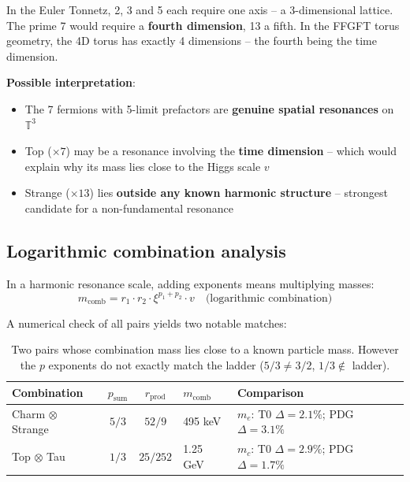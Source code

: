 In the Euler Tonnetz, 2, 3 and 5 each require one axis -- a
3-dimensional lattice. The prime 7 would require a
\textbf{fourth dimension}, 13 a fifth. In the FFGFT torus geometry,
the 4D torus has exactly 4 dimensions -- the fourth being the time
dimension.

\textbf{Possible interpretation}:
\begin{itemize}
    \item The 7 fermions with 5-limit prefactors are
          \textbf{genuine spatial resonances} on $\mathbb{T}^3$
    \item Top ($\times 7$) may be a resonance involving the
          \textbf{time dimension} -- which would explain why its
          mass lies close to the Higgs scale $v$
    \item Strange ($\times 13$) lies \textbf{outside any known
          harmonic structure} -- strongest candidate for a
          non-fundamental resonance
\end{itemize}

\subsection{Logarithmic combination analysis}

In a harmonic resonance scale, adding exponents means multiplying
masses:
\begin{equation}
    m_{\text{comb}} = r_1 \cdot r_2 \cdot \xi^{p_1+p_2} \cdot v
    \quad \text{(logarithmic combination)}
\end{equation}

A numerical check of all pairs yields two notable matches:

\begin{table}[htbp]
\centering\footnotesize
\begin{tabular}{lccll}
\toprule
\textbf{Combination} & $p_{\text{sum}}$ & $r_{\text{prod}}$ & $m_{\text{comb}}$ & \textbf{Comparison} \\
\midrule
Charm $\otimes$ Strange & $5/3$ & $52/9$ & 495 keV & $m_e$: T0 $\Delta{=}2.1\%$; PDG $\Delta{=}3.1\%$ \\
Top $\otimes$ Tau       & $1/3$ & $25/252$ & 1.25 GeV & $m_c$: T0 $\Delta{=}2.9\%$; PDG $\Delta{=}1.7\%$ \\
\bottomrule
\end{tabular}
\caption{Two pairs whose combination mass lies close to a known
particle mass. However the $p$ exponents do not exactly match the
ladder ($5/3 \neq 3/2$, $1/3 \notin$ ladder).}
\label{tab:combination}
\end{table}

